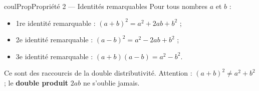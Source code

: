 \documentclass[11pt,a4paper]{article}
\makeatletter
\newcounter{lycee@signet}
\newcommand{\signet}[3][]{\stepcounter{lycee@signet}%
  \edef\lycee@dest{\if\relax\detokenize{#1}\relax
    signet.\arabic{lycee@signet}\else#1\fi}%
  \hypertarget{\lycee@dest}{}\bookmark[level=#2,dest=\lycee@dest]{#3}}
\def\textsuperscript#1{#1}\def\dfrac#1#2{#1/#2}\def\frac#1#2{#1/#2}%
\newenvironment{proprietebox}[1][Propriété]%
  {\begin{boitecours}[phantom={\signet{2}{#1}}]{coulProp}{#1}}{\end{boitecours}}
\makeatother
\begin{document}
\begin{proprietebox}[Propriété 2 --- Identités remarquables]
Pour tous nombres $a$ et $b$ :
\begin{itemize}
  \item 1\textsuperscript{re} identité remarquable : \quad $(a+b)^{2}=a^{2}+2ab+b^{2}$ ;
  \item 2\textsuperscript{e} identité remarquable : \quad $(a-b)^{2}=a^{2}-2ab+b^{2}$ ;
  \item 3\textsuperscript{e} identité remarquable : \quad $(a+b)(a-b)=a^{2}-b^{2}$.
\end{itemize}
\end{proprietebox}

\begin{remarquebox}
Ce sont des raccourcis de la double distributivité. Attention :
$(a+b)^{2}\ne a^{2}+b^{2}$ ; le \textbf{double produit} $2ab$ ne s'oublie jamais.
\end{remarquebox}
\end{document}
